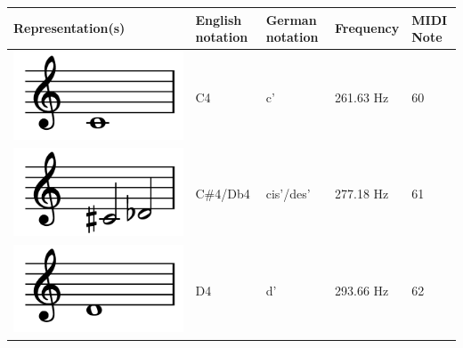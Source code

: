 \documentclass[a4paper, 11pt, twoside]{report}
\theoremstyle{definition}
\begin{document}
\begin{longtable}{ | M{3.5cm} | M{2.8cm} | M{2.8cm} | M{2.5cm} | M{2.2cm} | }
    \hline
    \small Representation(s)                                     & \small English notation & \small German notation & \small Frequency   & \small MIDI Note \\
    \hline
    \endhead
    \includegraphics[width=0.85\linewidth]{assets/notes/C4.png}  & C4                      & c'                     & 261.63 Hz          & 60               \\ \hline
    \includegraphics[width=0.85\linewidth]{assets/notes/CS4.png} & C\#4/Db4                & cis'/des'              & 277.18 Hz          & 61               \\ \hline
    \includegraphics[width=0.85\linewidth]{assets/notes/D4.png}  & D4                      & d'                     & 293.66 Hz          & 62               \\ \hline

\end{longtable}
\end{document}
